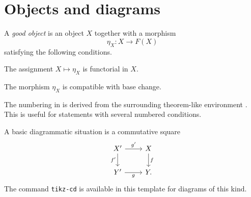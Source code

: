 

\showtodostrue
\showcommentstrue


\begin{abstract}
    This short note showcases the note template: theorem-like environments,
    theorem-numbered lists, ordinary enumerated lists, displayed equations,
    commutative diagrams, citations, URLs, and cross-references.
\end{abstract}

\maketitle

\tableofcontents

\section{Objects and diagrams}

\begin{definition}
    \label{definition:good-object}
    A \emph{good object} is an object \(X\) together with a morphism
    \[
        \eta_X \colon X \to F(X)
    \]
    satisfying the following conditions.
    \begin{theoremitems}
    \item The assignment \(X \mapsto \eta_X\) is functorial in \(X\).
        \label{item:good-functoriality} 
    \item The morphism \(\eta_X\) is compatible with base change.
        \label{item:good-compatibility} 
    \end{theoremitems}
\end{definition}

The numbering in  is
derived from the surrounding theorem-like environment
. This is useful for statements with several
numbered conditions.

\begin{example}
    \label{example:diagram}
    A basic diagrammatic situation is a commutative square
    \[
        \begin{tikzcd}
            X' \arrow[r, "g'"] \arrow[d, "f'"'] & X \arrow[d, "f"] \\
            Y' \arrow[r, "g"']                  & Y .
        \end{tikzcd}
    \]
    The command \texttt{tikz-cd} is available in this template for diagrams of this
    kind.
\end{example}

